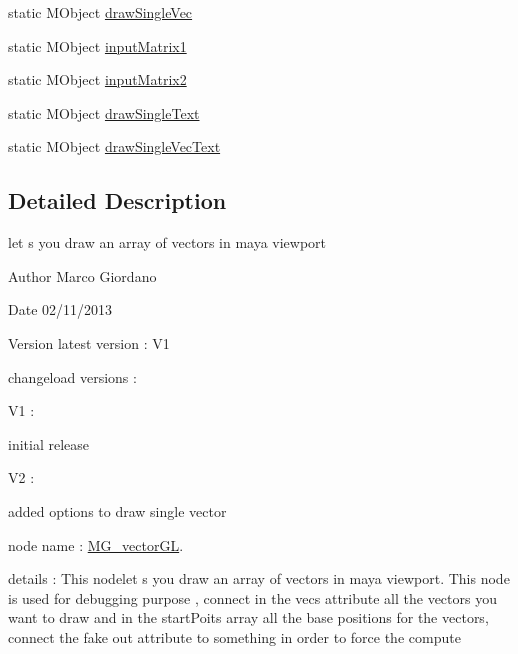 \begin{DoxyCompactItemize}
static M\-Object \hyperlink{class_m_g__vector_g_l_a234b67d8d0ff1579b5849207c8751e48}{draw\-Single\-Vec}
\item 
static M\-Object \hyperlink{class_m_g__vector_g_l_a8925db7e20eeb6ec2ca3a7afe829866a}{input\-Matrix1}
\item 
static M\-Object \hyperlink{class_m_g__vector_g_l_a68e287bd95b5110218020a612de4bf77}{input\-Matrix2}
\item 
static M\-Object \hyperlink{class_m_g__vector_g_l_a1a1b1a7aeae809b9b6d97019136a2399}{draw\-Single\-Text}
\item 
static M\-Object \hyperlink{class_m_g__vector_g_l_a05f25839a380964b6abbfa1d7ef8c691}{draw\-Single\-Vec\-Text}
\end{DoxyCompactItemize}


\subsection{Detailed Description}
let s you draw an array of vectors in maya viewport 

\begin{DoxyAuthor}{Author}
Marco Giordano 
\end{DoxyAuthor}
\begin{DoxyDate}{Date}
02/11/2013 
\end{DoxyDate}
\begin{DoxyVersion}{Version}
latest version \-: V1 

changeload versions \-: \par
 V1 \-: \par

\begin{DoxyItemize}
\item initial release \par
 V2 \-: \par

\item added options to draw single vector \par

\end{DoxyItemize}
\end{DoxyVersion}
node name \-: \hyperlink{class_m_g__vector_g_l}{M\-G\-\_\-vector\-G\-L}.

details \-: This nodelet s you draw an array of vectors in maya viewport. This node is used for debugging purpose , connect in the vecs attribute all the vectors you want to draw and in the start\-Poits array all the base positions for the vectors, connect the fake out attribute to something in order to force the compute

